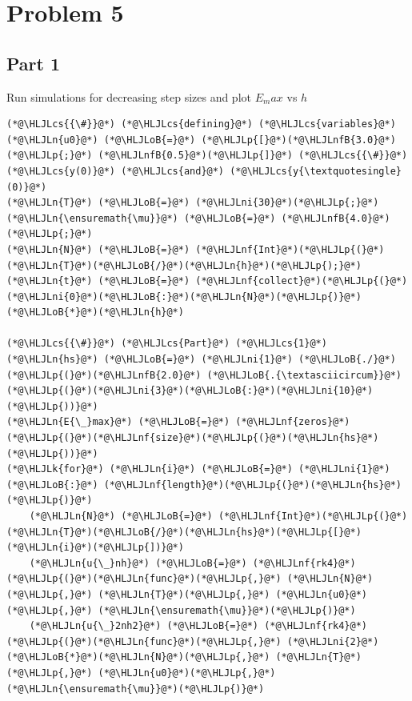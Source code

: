 \documentclass[12pt,a4paper]{article}
\newcommand{\HLJLk}[1]{\textcolor[RGB]{148,91,176}{\textbf{#1}}}
\newcommand{\HLJLn}[1]{#1}
\newcommand{\HLJLnf}[1]{\textcolor[RGB]{66,102,213}{#1}}
\newcommand{\HLJLnfB}[1]{\textcolor[RGB]{59,151,46}{#1}}
\newcommand{\HLJLni}[1]{\textcolor[RGB]{59,151,46}{#1}}
\newcommand{\HLJLoB}[1]{\textcolor[RGB]{102,102,102}{\textbf{#1}}}
\newcommand{\HLJLp}[1]{#1}
\newcommand{\HLJLcs}[1]{\textcolor[RGB]{153,153,119}{\textit{#1}}}
\begin{document}
\section{Problem 5}
\subsection{Part 1}
Run simulations for decreasing step sizes and plot $E_max$ vs $h$


\begin{lstlisting}
(*@\HLJLcs{{\#}}@*) (*@\HLJLcs{defining}@*) (*@\HLJLcs{variables}@*)
(*@\HLJLn{u0}@*) (*@\HLJLoB{=}@*) (*@\HLJLp{[}@*)(*@\HLJLnfB{3.0}@*)(*@\HLJLp{;}@*) (*@\HLJLnfB{0.5}@*)(*@\HLJLp{]}@*) (*@\HLJLcs{{\#}}@*) (*@\HLJLcs{y(0)}@*) (*@\HLJLcs{and}@*) (*@\HLJLcs{y{\textquotesingle}(0)}@*)
(*@\HLJLn{T}@*) (*@\HLJLoB{=}@*) (*@\HLJLni{30}@*)(*@\HLJLp{;}@*) (*@\HLJLn{\ensuremath{\mu}}@*) (*@\HLJLoB{=}@*) (*@\HLJLnfB{4.0}@*)(*@\HLJLp{;}@*)
(*@\HLJLn{N}@*) (*@\HLJLoB{=}@*) (*@\HLJLnf{Int}@*)(*@\HLJLp{(}@*)(*@\HLJLn{T}@*)(*@\HLJLoB{/}@*)(*@\HLJLn{h}@*)(*@\HLJLp{);}@*)
(*@\HLJLn{t}@*) (*@\HLJLoB{=}@*) (*@\HLJLnf{collect}@*)(*@\HLJLp{(}@*)(*@\HLJLni{0}@*)(*@\HLJLoB{:}@*)(*@\HLJLn{N}@*)(*@\HLJLp{)}@*)(*@\HLJLoB{*}@*)(*@\HLJLn{h}@*)

(*@\HLJLcs{{\#}}@*) (*@\HLJLcs{Part}@*) (*@\HLJLcs{1}@*)
(*@\HLJLn{hs}@*) (*@\HLJLoB{=}@*) (*@\HLJLni{1}@*) (*@\HLJLoB{./}@*)(*@\HLJLp{(}@*)(*@\HLJLnfB{2.0}@*) (*@\HLJLoB{.{\textasciicircum}}@*)(*@\HLJLp{(}@*)(*@\HLJLni{3}@*)(*@\HLJLoB{:}@*)(*@\HLJLni{10}@*)(*@\HLJLp{))}@*)
(*@\HLJLn{E{\_}max}@*) (*@\HLJLoB{=}@*) (*@\HLJLnf{zeros}@*)(*@\HLJLp{(}@*)(*@\HLJLnf{size}@*)(*@\HLJLp{(}@*)(*@\HLJLn{hs}@*)(*@\HLJLp{))}@*)
(*@\HLJLk{for}@*) (*@\HLJLn{i}@*) (*@\HLJLoB{=}@*) (*@\HLJLni{1}@*) (*@\HLJLoB{:}@*) (*@\HLJLnf{length}@*)(*@\HLJLp{(}@*)(*@\HLJLn{hs}@*)(*@\HLJLp{)}@*)
    (*@\HLJLn{N}@*) (*@\HLJLoB{=}@*) (*@\HLJLnf{Int}@*)(*@\HLJLp{(}@*)(*@\HLJLn{T}@*)(*@\HLJLoB{/}@*)(*@\HLJLn{hs}@*)(*@\HLJLp{[}@*)(*@\HLJLn{i}@*)(*@\HLJLp{])}@*)
    (*@\HLJLn{u{\_}nh}@*) (*@\HLJLoB{=}@*) (*@\HLJLnf{rk4}@*)(*@\HLJLp{(}@*)(*@\HLJLn{func}@*)(*@\HLJLp{,}@*) (*@\HLJLn{N}@*)(*@\HLJLp{,}@*) (*@\HLJLn{T}@*)(*@\HLJLp{,}@*) (*@\HLJLn{u0}@*)(*@\HLJLp{,}@*) (*@\HLJLn{\ensuremath{\mu}}@*)(*@\HLJLp{)}@*)
    (*@\HLJLn{u{\_}2nh2}@*) (*@\HLJLoB{=}@*) (*@\HLJLnf{rk4}@*)(*@\HLJLp{(}@*)(*@\HLJLn{func}@*)(*@\HLJLp{,}@*) (*@\HLJLni{2}@*)(*@\HLJLoB{*}@*)(*@\HLJLn{N}@*)(*@\HLJLp{,}@*) (*@\HLJLn{T}@*)(*@\HLJLp{,}@*) (*@\HLJLn{u0}@*)(*@\HLJLp{,}@*) (*@\HLJLn{\ensuremath{\mu}}@*)(*@\HLJLp{)}@*)


\end{lstlisting}
\end{document}
